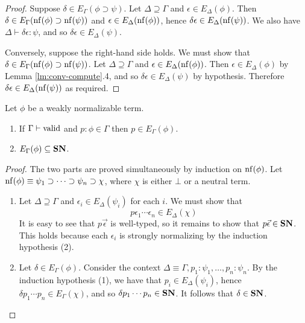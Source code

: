 \begin{proof}
Suppose $\delta \in E_\Gamma(\phi \supset \psi)$.  Let $\Delta \supseteq \Gamma$ and $\epsilon \in E_\Delta(\phi)$.  Then $\delta \in E_\Gamma(\mathrm{nf} ( {\phi} ) \supset \mathrm{nf} ( {\psi} ))$
and $\epsilon \in E_\Delta(\mathrm{nf} ( {\phi} ))$, hence $\delta \epsilon \in E_\Delta(\mathrm{nf} ( {\psi} ))$.  We also have $\Delta \vdash \delta \epsilon : \psi$, and so $\delta \epsilon \in E_\Delta(\psi)$.

Conversely, suppose the right-hand side holds.  We must show that $\delta \in E_\Gamma(\mathrm{nf} ( {\phi} ) \supset \mathrm{nf} ( {\psi} ))$.  Let $\Delta \supseteq \Gamma$ and $\epsilon \in
E_\Delta(\mathrm{nf} ( {\phi} ))$.  Then $\epsilon \in E_\Delta(\phi)$ by Lemma \ref{lm:conv-compute}.4, and so $\delta \epsilon \in E_\Delta(\psi)$ by hypothesis.  Therefore $\delta \epsilon \in E_\Delta(\mathrm{nf} ( {\psi} ))$
as required.
\end{proof}

\begin{lm}
\label{lm:varcompute1}
Let $\phi$ be a weakly normalizable term.
\begin{enumerate}
\item
If $\Gamma \vdash \mathrm{valid}$ and $p : \phi \in \Gamma$ then $p \in E_\Gamma(\phi)$.
\item
$E_\Gamma(\phi) \subseteq \mathbf{SN}$.
\end{enumerate}
\end{lm}

\begin{proof}
The two parts are proved simultaneously by induction on $\mathrm{nf} ( {\phi} )$.
Let $\mathrm{nf} ( {\phi} ) \equiv \psi_1 \supset \cdots \supset \psi_n \supset \chi$,
where $\chi$ is either $\bot$ or a neutral term.  
\begin{enumerate}
\item
Let $\Delta \supseteq \Gamma$ and $\epsilon_i \in E_\Delta(\psi_i)$ for
each $i$.  We must show that
\[ p \epsilon_1 \cdots \epsilon_n \in E_\Delta(\chi) \]
It is easy to see that $p \vec{\epsilon}$ is well-typed, so it remains to show that $p \vec{\epsilon} \in \mathbf{SN}$.
This holds because each $\epsilon_i$ is strongly normalizing by the induction hypothesis (2).
\item
Let $\delta \in E_\Gamma(\phi)$.  Consider the context $\Delta \equiv \Gamma, p_1 : \psi_1, \ldots, p_n : \psi_n$.
By the induction hypothesis (1), we have that $p_i \in E_\Delta(\psi_i)$, hence
$\delta p_1 \cdots p_n \in E_\Gamma(\chi)$, and so $\delta p_1 \cdots p_n \in \mathbf{SN}$.
It follows that $\delta \in \mathbf{SN}$.
\end{enumerate}
\end{proof}

